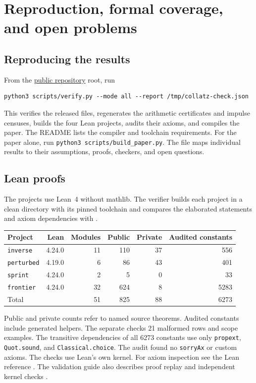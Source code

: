 \section{Reproduction, formal coverage, and open problems}
\label{sec:formal-scope}

\subsection{Reproducing the results}

From the \href{https://github.com/bruscaj/perturbed_collatz}{public
repository} root, run
\begin{verbatim}
python3 scripts/verify.py --mode all --report /tmp/collatz-check.json
\end{verbatim}
This verifies the released files, regenerates the arithmetic certificates
and impulse censuses, builds the four Lean projects, audits their axioms,
and compiles the paper. The README lists the compiler and toolchain
requirements. For the paper alone, run \texttt{python3 scripts/build\_paper.py}.
The file  maps individual results to their assumptions,
proofs, checkers, and open questions.

\subsection{Lean proofs}

The projects use Lean~4 \cite{demoura-ullrich-2021} without mathlib.
The verifier builds each project in a clean directory with its pinned
toolchain and compares the elaborated statements and axiom dependencies
with .

\begin{center}\small
\begin{tabular}{lrrrrr}\toprule
Project&Lean&Modules&Public&Private&Audited constants\\\midrule
\texttt{inverse}&4.24.0&11&110&37&556\\
\texttt{perturbed}&4.19.0&6&86&43&401\\
\texttt{sprint}&4.24.0&2&5&0&33\\
\texttt{frontier}&4.24.0&32&624&8&5283\\\midrule
Total&&51&825&88&6273\\\bottomrule
\end{tabular}
\end{center}
Public and private counts refer to named source theorems. Audited
constants include generated helpers. The separate
 checks 21 malformed rows and scope examples.
The transitive dependencies of all 6273 constants use only
\texttt{propext}, \texttt{Quot.sound}, and \texttt{Classical.choice}.
The audit found no \texttt{sorryAx} or custom axioms. The checks use
Lean's own kernel. For axiom inspection see the Lean reference
\cite[Sections~8.4--8.5]{lean-axioms-424}. The validation guide also
describes proof replay and independent kernel checks \cite{lean-validating-proofs}.

